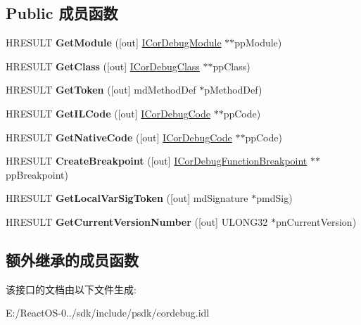 \subsection*{Public 成员函数}
\begin{DoxyCompactItemize}
\item 
\mbox{\label{interface_i_cor_debug_function_a91832cc57edf6e7067195af7e36fb3a6}} 
H\+R\+E\+S\+U\+LT {\bfseries Get\+Module} (\mbox{[}out\mbox{]} \hyperlink{interface_i_cor_debug_module}{I\+Cor\+Debug\+Module} $\ast$$\ast$pp\+Module)
\item 
\mbox{\label{interface_i_cor_debug_function_a5fa03f20e4d8804a5537d5efbb1330a2}} 
H\+R\+E\+S\+U\+LT {\bfseries Get\+Class} (\mbox{[}out\mbox{]} \hyperlink{interface_i_cor_debug_class}{I\+Cor\+Debug\+Class} $\ast$$\ast$pp\+Class)
\item 
\mbox{\label{interface_i_cor_debug_function_ab4768e006b29a1693ade3e296d381c7a}} 
H\+R\+E\+S\+U\+LT {\bfseries Get\+Token} (\mbox{[}out\mbox{]} md\+Method\+Def $\ast$p\+Method\+Def)
\item 
\mbox{\label{interface_i_cor_debug_function_ad606779af1bcc4152b57455e3e7d8b2c}} 
H\+R\+E\+S\+U\+LT {\bfseries Get\+I\+L\+Code} (\mbox{[}out\mbox{]} \hyperlink{interface_i_cor_debug_code}{I\+Cor\+Debug\+Code} $\ast$$\ast$pp\+Code)
\item 
\mbox{\label{interface_i_cor_debug_function_a3c64ee8fdbd4100391df284f7e4ed384}} 
H\+R\+E\+S\+U\+LT {\bfseries Get\+Native\+Code} (\mbox{[}out\mbox{]} \hyperlink{interface_i_cor_debug_code}{I\+Cor\+Debug\+Code} $\ast$$\ast$pp\+Code)
\item 
\mbox{\label{interface_i_cor_debug_function_a978836f0d5697831f70a4a46c6f6e8fa}} 
H\+R\+E\+S\+U\+LT {\bfseries Create\+Breakpoint} (\mbox{[}out\mbox{]} \hyperlink{interface_i_cor_debug_function_breakpoint}{I\+Cor\+Debug\+Function\+Breakpoint} $\ast$$\ast$pp\+Breakpoint)
\item 
\mbox{\label{interface_i_cor_debug_function_a264f1076cf93e539a1d5376569514560}} 
H\+R\+E\+S\+U\+LT {\bfseries Get\+Local\+Var\+Sig\+Token} (\mbox{[}out\mbox{]} md\+Signature $\ast$pmd\+Sig)
\item 
\mbox{\label{interface_i_cor_debug_function_abb09408868b133e41faed48e08be25b2}} 
H\+R\+E\+S\+U\+LT {\bfseries Get\+Current\+Version\+Number} (\mbox{[}out\mbox{]} U\+L\+O\+N\+G32 $\ast$pn\+Current\+Version)
\end{DoxyCompactItemize}
\subsection*{额外继承的成员函数}


该接口的文档由以下文件生成\+:\begin{DoxyCompactItemize}
\item 
E\+:/\+React\+O\+S-\/0../sdk/include/psdk/cordebug.\+idl\end{DoxyCompactItemize}
